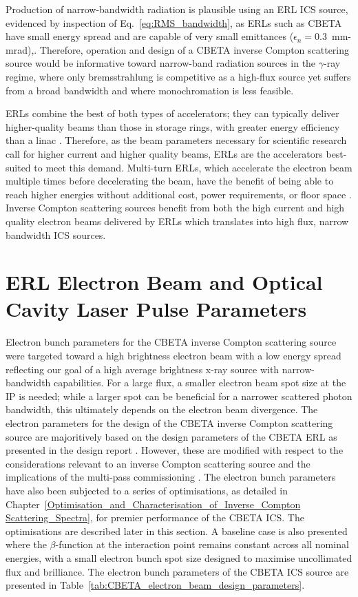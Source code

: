\documentclass[../main.tex]{subfiles}
\begin{document}
 Production of narrow-bandwidth radiation is plausible using an ERL ICS source, evidenced by inspection of Eq.~\ref{eq:RMS_bandwidth}, as ERLs such as CBETA have small energy spread and are capable of very small emittances ($\epsilon_{n} = 0.3$~\si{\milli\meter}-\si{\milli\radian}),. Therefore, operation and design of a CBETA inverse Compton scattering source would be informative toward narrow-band radiation sources in the $\gamma$-ray regime, where only bremsstrahlung is competitive as a high-flux source yet suffers from a broad bandwidth and where monochromation is less feasible.
 
 ERLs combine the best of both types of accelerators; they can typically deliver higher-quality beams than those in storage rings, with greater energy efficiency than a linac \cite{smith2006optic}. Therefore, as the beam parameters necessary for scientific research call for higher current and higher quality beams, ERLs are the accelerators best-suited to meet this demand. Multi-turn ERLs, which accelerate the electron beam multiple times before decelerating the beam, have the benefit of being able to reach higher energies without additional cost, power requirements, or floor space \cite{merminga2003high}. Inverse Compton scattering sources benefit from both the high current and high quality electron beams delivered by ERLs which translates into high flux, narrow bandwidth ICS sources. 

\section{ERL Electron Beam and Optical Cavity Laser Pulse Parameters}

Electron bunch parameters for the CBETA inverse Compton scattering source were targeted toward a high brightness electron beam with a low energy spread reflecting our goal of a high average brightness x-ray source with narrow-bandwidth capabilities. For a large flux, a smaller electron beam spot size at the IP is needed; while a larger spot can be beneficial for a narrower scattered photon bandwidth, this ultimately depends on the electron beam divergence. The electron parameters for the design of the CBETA inverse Compton scattering source are majoritively based on the design parameters of the CBETA ERL as presented in the design report \cite{hoffstaetter2017cbeta}. However, these are modified with respect to the considerations relevant to an inverse Compton scattering source and the implications of the multi-pass commissioning \cite{bartnik2020cbeta}. The electron bunch parameters have also been subjected to a series of optimisations, as detailed in Chapter~\ref{Optimisation_and_Characterisation_of_Inverse_Compton Scattering_Spectra}, for premier performance of the CBETA ICS. The optimisations are described later in this section. A baseline case is also presented where the $\beta$-function at the interaction point remains constant across all nominal energies, with a small electron bunch spot size designed to maximise uncollimated flux and brilliance. The electron bunch parameters of the CBETA ICS source are presented in Table~\ref{tab:CBETA_electron_beam_design_parameters}.  
\end{document}
